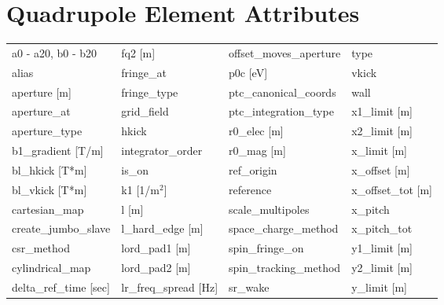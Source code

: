  \section{Quadrupole Element Attributes}
 \label{s:list.quadrupole}
 
 \begin{tabular}{llll} \toprule
a0 - a20, b0 - b20             & fq2 [m]                        & offset_moves_aperture          & type                           \\
alias                          & fringe_at                      & p0c [eV]                       & vkick                          \\
aperture [m]                   & fringe_type                    & ptc_canonical_coords           & wall                           \\
aperture_at                    & grid_field                     & ptc_integration_type           & x1_limit [m]                   \\
aperture_type                  & hkick                          & r0_elec [m]                    & x2_limit [m]                   \\
b1_gradient [T/m]              & integrator_order               & r0_mag [m]                     & x_limit [m]                    \\
bl_hkick [T*m]                 & is_on                          & ref_origin                     & x_offset [m]                   \\
bl_vkick [T*m]                 & k1 [1/m$^2$]                   & reference                      & x_offset_tot [m]               \\
cartesian_map                  & l [m]                          & scale_multipoles               & x_pitch                        \\
create_jumbo_slave             & l_hard_edge [m]                & space_charge_method            & x_pitch_tot                    \\
csr_method                     & lord_pad1 [m]                  & spin_fringe_on                 & y1_limit [m]                   \\
cylindrical_map                & lord_pad2 [m]                  & spin_tracking_method           & y2_limit [m]                   \\
delta_ref_time [sec]           & lr_freq_spread [Hz]            & sr_wake                        & y_limit [m]                    \\

\end{tabular}
